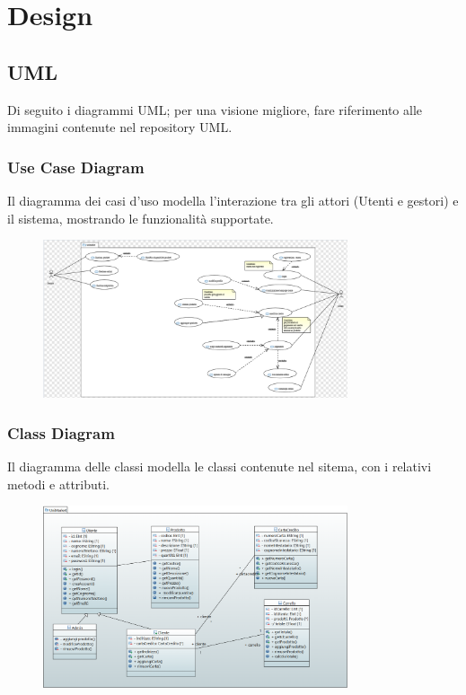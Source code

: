 \documentclass[a4paper,12pt]{article}
\begin{document}
\section{Design}
\subsection{UML}
Di seguito i diagrammi UML; per una visione migliore, fare riferimento alle immagini contenute nel repository UML.
\subsubsection{Use Case Diagram}
Il diagramma dei casi d'uso modella l'interazione tra gli attori (Utenti e gestori) e il sistema, mostrando le funzionalità supportate.
\begin{figure}[H]
    \centering
    \includegraphics[width=0.8\textwidth]{../UML/UML png/UseCaseDiagram.png}
    \label{fig:Use Case Diagram}
\end{figure}
\subsubsection{Class Diagram}
Il diagramma delle classi modella le classi contenute nel sitema, con i relativi metodi e attributi.
\begin{figure}[H]
    \centering
    \includegraphics[width=0.8\textwidth]{../UML/UML png/ClassDiagram.png}
    \label{fig:Class Diagram}
\end{figure}
\end{document}
